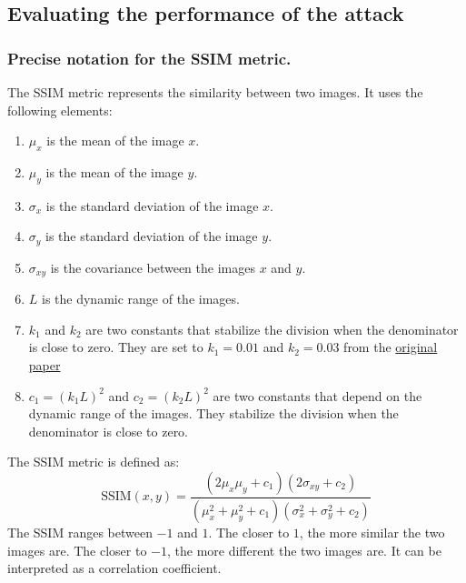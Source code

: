 \documentclass[12pt]{article}
\begin{document}
\subsection{Evaluating the performance of the attack}
\subsubsection{Precise notation for the SSIM metric.}
The SSIM metric represents the similarity between two images. It uses the following elements:
\begin{enumerate}
  \item $\mu_x$ is the mean of the image $x$.
  \item $\mu_y$ is the mean of the image $y$.
  \item $\sigma_x$ is the standard deviation of the image $x$.
  \item $\sigma_y$ is the standard deviation of the image $y$.
  \item $\sigma_{xy}$ is the covariance between the images $x$ and $y$.
  \item $L$ is the dynamic range of the images.
  \item $k_1$ and $k_2$ are two constants that stabilize the division when the denominator is close to zero. They are set to $k_1 = 0.01$ and $k_2 = 0.03$ from the \href{https://ece.uwaterloo.ca/~z70wang/publications/ssim.pdf}{original paper}
  \item $c_1 = (k_1 L)^2$ and $c_2 = (k_2 L)^2$ are two constants that depend on the dynamic range of the images. They stabilize the division when the denominator is close to zero.
\end{enumerate}
The SSIM metric is defined as:
\begin{equation}
  \text{SSIM}(x, y) = \frac{(2 \mu_x \mu_y + c_1)(2 \sigma_{xy} + c_2)}{(\mu_x^2 + \mu_y^2 + c_1)(\sigma_x^2 + \sigma_y^2 + c_2)}
\end{equation}
The SSIM ranges between $-1$ and $1$. The closer to $1$, the more similar the two images are. The closer to $-1$, the more different the two images are. It can be interpreted as a correlation coefficient.
\end{document}

